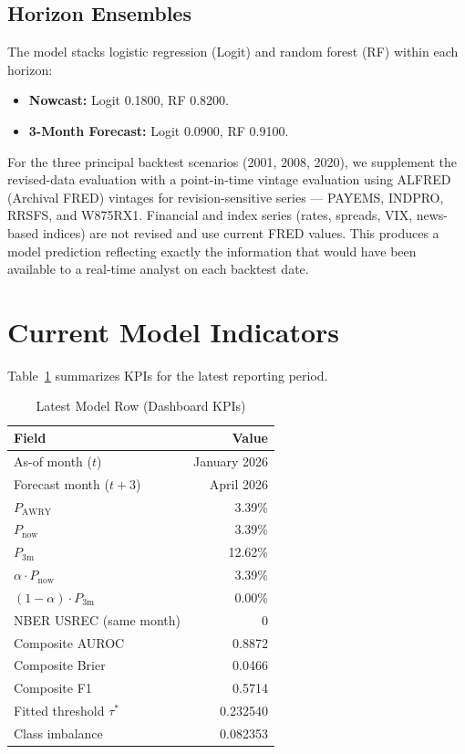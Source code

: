 \documentclass[conference,onecolumn]{IEEEtran}
\begin{document}
\subsection{Horizon Ensembles}
The model stacks logistic regression (Logit) and random forest (RF) within each horizon:
\begin{itemize}
\item \textbf{Nowcast:} Logit 0.1800, RF 0.8200.
\item \textbf{3-Month Forecast:} Logit 0.0900, RF 0.9100.
\end{itemize}
For the three principal backtest scenarios (2001, 2008, 2020), we supplement the revised-data evaluation with a point-in-time vintage evaluation using ALFRED (Archival FRED) vintages for revision-sensitive series --- PAYEMS, INDPRO, RRSFS, and W875RX1. Financial and index series (rates, spreads, VIX, news-based indices) are not revised and use current FRED values. This produces a model prediction reflecting exactly the information that would have been available to a real-time analyst on each backtest date.

\section{Current Model Indicators}
Table~\ref{tab:kpi} summarizes KPIs for the latest reporting period.

\begin{table}[htbp]
\caption{Latest Model Row (Dashboard KPIs)}
\begin{center}
\begin{tabular}{|l|r|}
\hline
\textbf{Field} & \textbf{Value} \\
\hline
As-of month ($t$) & January 2026 \\
Forecast month ($t+3$) & April 2026 \\
$P_{\mathrm{AWRY}}$ & 3.39\% \\
$P_{\mathrm{now}}$ & 3.39\% \\
$P_{\mathrm{3m}}$ & 12.62\% \\
$\alpha \cdot P_{\mathrm{now}}$ & 3.39\% \\
$(1-\alpha) \cdot P_{\mathrm{3m}}$ & 0.00\% \\
NBER USREC (same month) & 0 \\
Composite AUROC & 0.8872 \\
Composite Brier & 0.0466 \\
Composite F1 & 0.5714 \\
Fitted threshold $\tau^*$ & 0.232540 \\
Class imbalance & 0.082353 \\
\hline
\end{tabular}
\label{tab:kpi}
\end{center}
\end{table}
\end{document}
